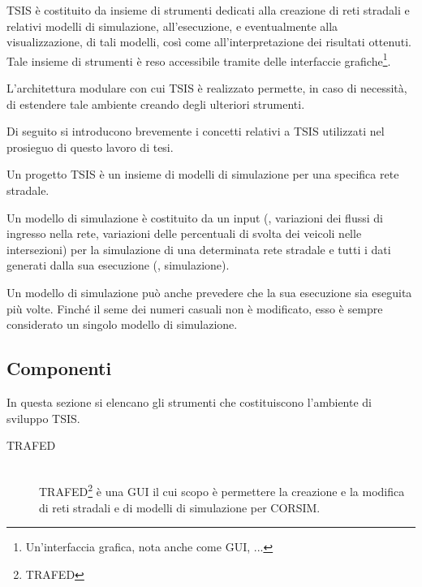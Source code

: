 \acs{TSIS} è costituito da insieme di strumenti dedicati alla creazione di reti stradali e relativi modelli di simulazione, all'esecuzione, e eventualmente alla visualizzazione, di tali modelli, così come all'interpretazione dei risultati ottenuti. Tale insieme di strumenti è reso accessibile tramite delle interfaccie grafiche\footnote{Un'interfaccia grafica, nota anche come \acf{GUI}, ...}.

L'architettura modulare con cui \acs{TSIS} è realizzato permette, in caso di necessità, di estendere tale ambiente creando degli ulteriori strumenti.

Di seguito si introducono brevemente i concetti relativi a \acs{TSIS} utilizzati nel prosieguo di questo lavoro di tesi.

\begin{definizione}\label{defn:tsis-proj}
Un progetto \acs{TSIS} è un insieme di modelli di simulazione per una specifica rete stradale.
\end{definizione}

\begin{definizione}\label{defn:tsis-sim-model}
Un modello di simulazione è costituito da un input (\eg{}, variazioni dei flussi di ingresso nella rete, variazioni delle percentuali di svolta dei veicoli nelle intersezioni) per la simulazione di una determinata rete stradale e tutti i dati generati dalla sua esecuzione (\ie{}, simulazione).
\end{definizione}
\begin{osservazione}
Un modello di simulazione può anche prevedere che la sua esecuzione sia eseguita più volte. Finché il seme dei numeri casuali non è modificato, esso è sempre considerato un singolo modello di simulazione.
\end{osservazione}

\subsection{Componenti}

In questa sezione si elencano gli strumenti che costituiscono l'ambiente di sviluppo \acs{TSIS}.

\begin{description}
\item[TRAFED] \hfill \\
\acs{TRAFED}\footnote{\acf{TRAFED}} è una \acs{GUI} il cui scopo è permettere la creazione e la modifica di reti stradali e di modelli di simulazione per \acs{CORSIM}.
\end{description}

